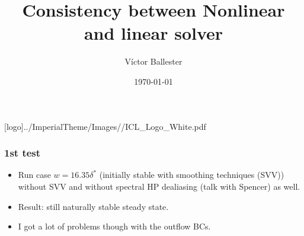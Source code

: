 \documentclass[
	aspectratio=169, %
	t, %
	onlytextwidth, %
	10pt, %
]{beamer}
\title{Consistency between Nonlinear and linear solver} %
\subtitle{} %
\author{Víctor Ballester} %
\date{\today} %
\def\imagefolder{../ImperialTheme/Images/}
\begin{document}
\begingroup
{} %
[logo]{\imagefolder/ICL_Logo_White.pdf} %
\frame[plain, s]{\titlepage} %
\endgroup


\begin{frame}
	\frametitle{1st test}
	\begin{itemize}
		\item Run case $w = 16.35\delta^*$ (initially stable with smoothing techniques (SVV)) without SVV and without spectral HP dealiasing (talk with Spencer) as well.
		\item Result: still naturally stable steady state.	
		\item I got a lot of problems though with the outflow BCs.
	\end{itemize}
\end{frame}
\end{document}
